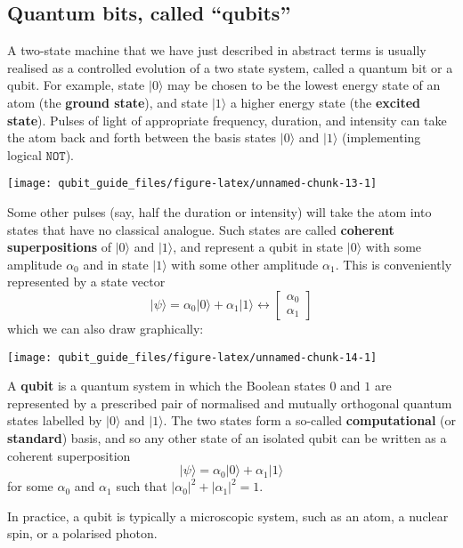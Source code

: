 \documentclass[fleqn]{article}
\newenvironment{idea}{\noindent}{\medskip}
\begin{document}
\hypertarget{quantum-bits-called-qubits}{%
\subsection{Quantum bits, called ``qubits''}\label{quantum-bits-called-qubits}}

A two-state machine that we have just described in abstract terms is usually realised as a controlled evolution of a two state system, called a quantum bit or a qubit.
For example, state \(|0\rangle\) may be chosen to be the lowest energy state of an atom (the \textbf{ground state}), and state \(|1\rangle\) a higher energy state (the \textbf{excited state}).
Pulses of light of appropriate frequency, duration, and intensity can take the atom back and forth between the basis states \(|0\rangle\) and \(|1\rangle\) (implementing logical \(\texttt{NOT}\)).

\begin{center}\texttt{[image: qubit\_guide\_files/figure-latex/unnamed-chunk-13-1]} \end{center}

Some other pulses (say, half the duration or intensity) will take the atom into states that have no classical analogue.
Such states are called \textbf{coherent superpositions} of \(|0\rangle\) and \(|1\rangle\), and represent a qubit in state \(|0\rangle\) with some amplitude \(\alpha_0\) and in state \(|1\rangle\) with some other amplitude \(\alpha_1\).
This is conveniently represented by a state vector
\[
    |\psi\rangle =
    \alpha_0|0\rangle + \alpha_1|1\rangle
    \leftrightarrow
    \begin{bmatrix}
      \alpha_0
    \\\alpha_1
    \end{bmatrix}
\]
which we can also draw graphically:

\begin{center}\texttt{[image: qubit\_guide\_files/figure-latex/unnamed-chunk-14-1]} \end{center}

\begin{idea}
A \textbf{qubit} is a quantum system in which the Boolean states \(0\) and \(1\) are represented by a prescribed pair of normalised and mutually orthogonal quantum states labelled by \(|0\rangle\) and \(|1\rangle\).
The two states form a so-called \textbf{computational} (or \textbf{standard}) basis, and so any other state of an isolated qubit can be written as a coherent superposition
\[
  |\psi\rangle = \alpha_0|0\rangle + \alpha_1|1\rangle
\]
for some \(\alpha_0\) and \(\alpha_1\) such that \(|\alpha_0|^2 + |\alpha_1|^2 = 1\).

In practice, a qubit is typically a microscopic system, such as an atom, a nuclear spin, or a polarised photon.

\end{idea}
\end{document}
